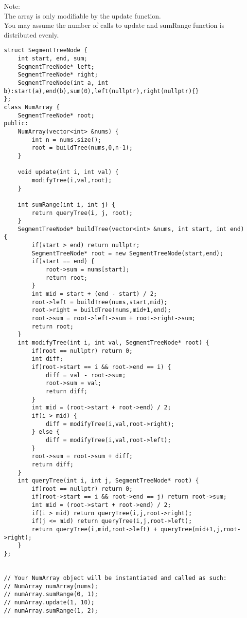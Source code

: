 Note:\\
    The array is only modifiable by the update function.\\
    You may assume the number of calls to update and sumRange function is distributed evenly.\\

\begin{lstlisting}
struct SegmentTreeNode {
    int start, end, sum;
    SegmentTreeNode* left;
    SegmentTreeNode* right;
    SegmentTreeNode(int a, int b):start(a),end(b),sum(0),left(nullptr),right(nullptr){}
};
class NumArray {
    SegmentTreeNode* root;
public:
    NumArray(vector<int> &nums) {
        int n = nums.size();
        root = buildTree(nums,0,n-1);
    }
   
    void update(int i, int val) {
        modifyTree(i,val,root);
    }

    int sumRange(int i, int j) {
        return queryTree(i, j, root);
    }
    SegmentTreeNode* buildTree(vector<int> &nums, int start, int end) {
        if(start > end) return nullptr;
        SegmentTreeNode* root = new SegmentTreeNode(start,end);
        if(start == end) {
            root->sum = nums[start];
            return root;
        }
        int mid = start + (end - start) / 2;
        root->left = buildTree(nums,start,mid);
        root->right = buildTree(nums,mid+1,end);
        root->sum = root->left->sum + root->right->sum;
        return root;
    }
    int modifyTree(int i, int val, SegmentTreeNode* root) {
        if(root == nullptr) return 0;
        int diff;
        if(root->start == i && root->end == i) {
            diff = val - root->sum;
            root->sum = val;
            return diff;
        }
        int mid = (root->start + root->end) / 2;
        if(i > mid) {
            diff = modifyTree(i,val,root->right);
        } else {
            diff = modifyTree(i,val,root->left);
        }
        root->sum = root->sum + diff;
        return diff;
    }
    int queryTree(int i, int j, SegmentTreeNode* root) {
        if(root == nullptr) return 0;
        if(root->start == i && root->end == j) return root->sum;
        int mid = (root->start + root->end) / 2;
        if(i > mid) return queryTree(i,j,root->right);
        if(j <= mid) return queryTree(i,j,root->left);
        return queryTree(i,mid,root->left) + queryTree(mid+1,j,root->right);
    }
};


// Your NumArray object will be instantiated and called as such:
// NumArray numArray(nums);
// numArray.sumRange(0, 1);
// numArray.update(1, 10);
// numArray.sumRange(1, 2);
\end{lstlisting}


